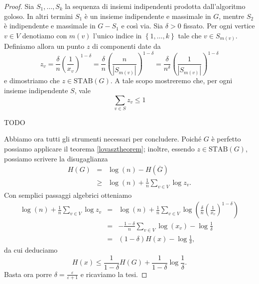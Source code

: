 \begin{proof}
	Sia \(S_1,\dots,S_k\) la sequenza di insiemi indipendenti prodotta dall'algoritmo goloso. In altri termini \(S_1\) è un insieme indipendente e massimale in \(G\), mentre \(S_2\) è indipendente e massimale in \(G-S_1\) e così via. Sia \(\delta>0\) fissato. Per ogni vertice \(v\in V\) denotiamo con \(m(v)\) l'unico indice in \(\left\{1,\dots,k\right\}\) tale che \(v\in S_{m(v)}\). Definiamo allora un punto \(z\) di componenti date da
	\[z_v=\frac{\delta}{n}\left(\frac{1}{x_v}\right)^{1-\delta}=\frac{\delta}{n}\left(\frac{n}{|S_{m(v)}|}\right)^{1-\delta}=\frac{\delta}{n^{\delta}}\left(\frac{1}{|S_{m(v)}|}\right)^{1-\delta}\]
	e dimostriamo che \(z\in\text{STAB}(G)\). A tale scopo mostreremo che, per ogni insieme indipendente \(S\), vale
	\[\sum_{v\in S}{z_v}\le 1\]
	
	TODO
	
	Abbiamo ora tutti gli strumenti necessari per concludere. Poiché \(G\) è perfetto possiamo applicare il teorema \ref{lovasztheorem}; inoltre, essendo \(z\in\text{STAB}(G)\), possiamo scrivere la disugaglianza
	\begin{eqnarray}
	  H(G)&=&\log(n)-H(\overline{G}) \nonumber \\
	      &\ge& \log(n) + \frac{1}{n}\sum_{v\in V}{\log{z_v}}.\nonumber
	\end{eqnarray}
	Con semplici passaggi algebrici otteniamo
	\begin{eqnarray}
	     \log(n) + \frac{1}{n}\sum_{v\in V}{\log{z_v}} &=& \log(n) + \frac{1}{n}\sum_{v\in V}{\log\left(\frac{\delta}{n}\left(\frac{1}{x_v}\right)^{1-\delta}\right)} \nonumber \\
	      &=& - \frac{1-\delta}{n}\sum_{v\in V}{\log(x_v)}-\log{\frac{1}{\delta}} \nonumber \\
	      &=& (1-\delta)H(x)-\log{\frac{1}{\delta}} \nonumber,
	\end{eqnarray}
	da cui deduciamo
	\[H(x)\le\frac{1}{1-\delta}H(G)+\frac{1}{1-\delta}\log{\frac{1}{\delta}}.\]
	Basta ora porre \(\delta=\frac{\varepsilon}{\varepsilon+1}\) e ricaviamo la tesi.
\end{proof}
